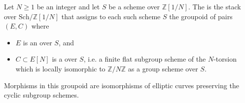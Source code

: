 \begin{definition} \label{definition:moduli_stack_of_cyclic_N_isogenies}
Let $N \geq 1$ be an integer and let $S$ be a scheme over $\mathbb{Z}[1/N]$. The  is the stack over $\mathrm{Sch}/\mathbb{Z}[1/N]$ that assigns to each such scheme $S$ the groupoid of pairs $(E, C)$ where
\begin{itemize}
    \item $E$ is an  over $S$, and
    \item $C \subset E[N]$ is a  over $S$, i.e. a finite flat subgroup scheme of the $N$-torsion  which is locally isomorphic to $\mathbb{Z}/N\mathbb{Z}$ as a group scheme over $S$.
\end{itemize}
Morphisms in this groupoid are isomorphisms of elliptic curves preserving the cyclic subgroup schemes.
\end{definition}
